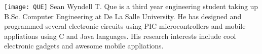\vfill

\texttt{[image: QUE]}
Sean Wyndell T. Que is a third year engineering student taking up B.Sc. Computer Engineering at De La Salle University. He has designed and programmed several electronic circuits using PIC microcontrollers and mobile appliations using C and Java languages. His research interests include cool electronic gadgets and awesome mobile appliations.

\vfill